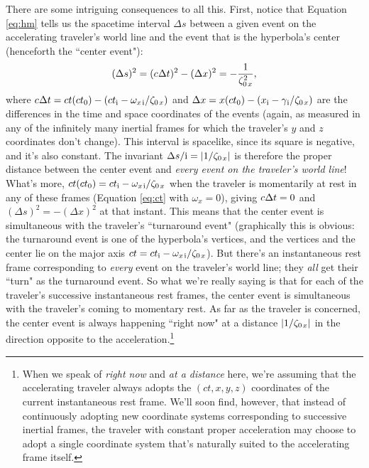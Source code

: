 \documentclass[12pt]{article}
\begin{document}
There are some intriguing consequences to all this. First, notice that Equation \ref{eq:hm} tells us the spacetime interval $\Delta s$ between a given event on the accelerating traveler's world line and the event that is the hyperbola's center (henceforth the ``center event"):
\begin{equation*}
(\Delta s)^2 = (c \mkern.5mu \Delta t)^2 - (\Delta x)^2 = - \dfrac{1}{ \zeta^2_{0 \mkern2mu x}},
\end{equation*}
where $c \mkern.5mu \Delta t = ct(ct_0) - (ct_{\mathrm{i}} - \omega_{x \mkern2mu \textrm{i} } / \zeta_{0 \mkern2mu x})$ and $\Delta x = x(ct_0) - (x_{\mathrm{i}} - \gamma_{\mkern1mu \mathrm{i}} / \zeta_{0 \mkern2mu x})$ are the differences in the time and space coordinates of the events (again, as measured in any of the infinitely many inertial frames for which the traveler's $y$ and $z$ coordinates don't change). This interval is spacelike, since its square is negative, and it's also constant. The invariant $\Delta s / \mathrm{i} = |1 / \zeta_{0 \mkern2mu x}|$ is therefore the proper distance between the center event and \emph{every event on the traveler's world line}! What's more, $ct(ct_0) = ct_{\mathrm{i}} - \omega_{x \mkern2mu \textrm{i} } / \zeta_{0 \mkern2mu x}$ when the traveler is momentarily at rest in any of these frames (Equation \ref{eq:ct} with $\omega_x = 0$), giving $c \mkern.5mu \Delta t = 0$ and $(\Delta s)^2 = - (\Delta x)^2$ at that instant. This means that the center event is simultaneous with the traveler's ``turnaround event" (graphically this is obvious: the turnaround event is one of the hyperbola's vertices, and the vertices and the center lie on the major axis $ct = ct_{\mathrm{i}} - \omega_{x \mkern2mu \textrm{i} } / \zeta_{0 \mkern2mu x}$). But there's an instantaneous rest frame corresponding to \emph{every} event on the traveler's world line; they \emph{all} get their ``turn" as the turnaround event. So what we're really saying is that for each of the traveler's successive instantaneous rest frames, the center event is simultaneous with the traveler's coming to momentary rest. As far as the traveler is concerned, the center event is always happening ``right now" at a distance $|1 / \zeta_{0 \mkern2mu x}|$ in the direction opposite to the acceleration.\footnote{When we speak of \emph{right now} and \emph{at a distance} here, we're assuming that the accelerating traveler always adopts the $(ct, x, y, z)$ coordinates of the current instantaneous rest frame. We'll soon find, however, that instead of continuously adopting new coordinate systems corresponding to successive inertial frames, the traveler with constant proper acceleration may choose to adopt a single coordinate system that's naturally suited to the accelerating frame itself.}
\end{document}
